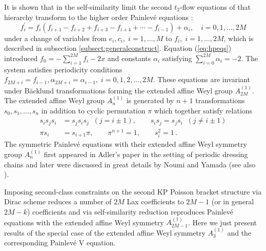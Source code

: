 \documentclass[12pt]{article}
\numberwithin{equation}{section}
\def\rf#1{(\ref{eq:#1})}
\def\lab#1{\label{eq:#1}}
\begin{document}
It is shown that in the self-similarity limit the second $t_2$-flow 
equations of that hierarchy
transform to the higher order Painlev\'e equations :
\begin{equation}
f_i^{\prime} = f_i \left(f_{i+1}- f_{i+2} + f_{i+3} -
f_{i+4}+{\cdots}-f_{i-1}  \right) + \alpha_i, \quad i=0,1,\ldots,2M 
\lab{hpeqs}
\end{equation}
under a change of variables from
$e_i, c_i, \; i=1,{\ldots} ,M$ to $f_i,\; i=1,{\ldots} ,2 M$,
which is described in subsection \ref{subsect:generalconstruct}.
Equation \rf{hpeqs} introduced $f_0=-\sum_{i=1}^{2M} f_i -2 x$ and 
constants $\alpha_i$ satisfying
$\sum_{i=0}^{2M} \alpha_i =-2$. 
The system satisfies periodicity conditions
$f_{2M+i}=f_{i-1} ,\alpha_{2M+i}=\alpha_{i-1},\; 
i=0,1,2,{\ldots} ,2M$.
These equations are invariant under B\"acklund transformations forming 
the extended affine Weyl group $A^{(1)}_{2M}$.
The extended affine Weyl group $A^{(1)}_{n}$ is generated 
by $n+1$ transformations $s_0, s_1, {\ldots} , s_n$
in addition to cyclic permutation $\pi$
which together satisfy relations
\[ \begin{split}
s_i s_{j} s_i &= s_{j} s_i s_{j}\;\;(j=i \pm 1)
, \qquad s_i s_{j}= s_{j} s_i \;\;(j\ne i \pm 1)\\
\pi s_i &= s_{i+1} \pi, \qquad \pi^{n+1} = 1,\qquad s_i^2=1  \, .
\end{split}
\]
The symmetric Painlev\'e equations with their extended affine Weyl 
symmetry group $A^{(1)}_{n}$
first appeared in Adler's paper \cite{Adler93}
in the setting of periodic dressing chains and later 
were discussed in great details by Noumi and Yamada \cite{NoumiYamada98a,
NoumiYamada98b} (see also \cite{noumibk}).


Imposing second-class constraints on  the
second KP Poisson bracket structure via Dirac scheme reduces a number of  $2 M$ Lax
coefficients to $2M-1$ (or in general $2M-k$) coefficients and via
self-similarity reduction reproduces Painlev\'e equations with
the extended affine Weyl symmetry $A^{(1)}_{2M-1}$. Here we just
present results of the special case of the extended affine 
Weyl symmetry $A^{(1)}_{3}$ and the corresponding 
Painlev\'e V equation.
\end{document}
